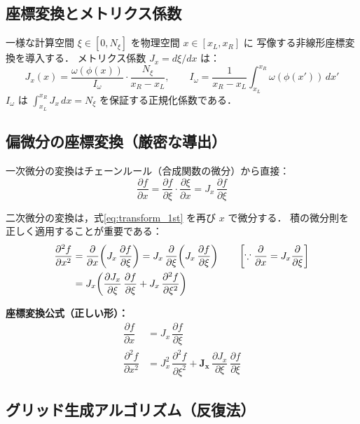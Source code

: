 \documentclass[12pt, a4paper, titlepage]{article}
\newcommand{\jp}[1]{{\normalfont\jpfont #1}}
\newcommand{\pd}[2]{\dfrac{\partial #1}{\partial #2}}
\newcommand{\pdd}[2]{\dfrac{\partial^2 #1}{\partial #2^2}}
\begin{document}
\subsection{\jp{座標変換とメトリクス係数}}

\jp{一様な計算空間 $\xi \in [0, N_\xi]$ を物理空間 $x \in [x_L, x_R]$ に
写像する非線形座標変換を導入する．
メトリクス係数 $J_x = d\xi/dx$ は：}
\begin{equation}
  J_x(x) = \frac{\omega(\phi(x))}{I_\omega}\cdot\frac{N_\xi}{x_R - x_L},
  \qquad
  I_\omega = \frac{1}{x_R - x_L}\int_{x_L}^{x_R}\omega(\phi(x'))\,dx'
  \label{eq:metrics}
\end{equation}
\jp{$I_\omega$ は $\int_{x_L}^{x_R} J_x\,dx = N_\xi$ を保証する正規化係数である．}

\subsection{\jp{偏微分の座標変換（厳密な導出）}}
\label{sec:coord_transform}

\jp{一次微分の変換はチェーンルール（合成関数の微分）から直接：}
\begin{equation}
  \pd{f}{x} = \pd{f}{\xi}\cdot\pd{\xi}{x} = J_x\,\pd{f}{\xi}
  \label{eq:transform_1st}
\end{equation}

\jp{二次微分の変換は，式\eqref{eq:transform_1st} を再び $x$ で微分する．
積の微分則を正しく適用することが重要である：}
\begin{align}
  \pdd{f}{x}
  &= \pd{}{x}\!\left(J_x\,\pd{f}{\xi}\right)
  = J_x\,\pd{}{\xi}\!\left(J_x\,\pd{f}{\xi}\right)
  \qquad\left[\because \pd{}{x} = J_x\pd{}{\xi}\right] \notag\\
  &= J_x\!\left(\pd{J_x}{\xi}\,\pd{f}{\xi} + J_x\,\pdd{f}{\xi}\right)
\end{align}

\begin{tcolorbox}[resultbox]
\textbf{\jp{座標変換公式（正しい形）：}}
\begin{align}
  \pd{f}{x} &= J_x\,\pd{f}{\xi}
  \label{eq:transform_1st_correct}\\[6pt]
  \pdd{f}{x} &= J_x^2\,\pdd{f}{\xi} + \mathbf{J_x}\,\pd{J_x}{\xi}\,\pd{f}{\xi}
  \label{eq:transform_2nd_correct}
\end{align}
\end{tcolorbox}

\subsection{\jp{グリッド生成アルゴリズム（反復法）}}
\end{document}
